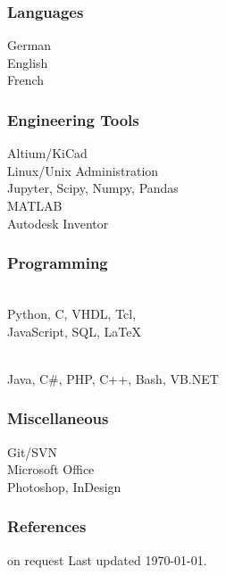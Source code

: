 \begin{facts}
    \subsubsection{Languages}
    German \\
    English \\
    French 
    \sectionsep
    
    \subsubsection{Engineering Tools}
    Altium/KiCad\\
    Linux/Unix Administration\\
    Jupyter, Scipy, Numpy, Pandas\\
    MATLAB\\
    Autodesk Inventor
    \sectionsep
    
    \subsubsection{Programming}
    \\
    Python, C, VHDL, Tcl,\\
    JavaScript, SQL, LaTeX
    \sectionsep
    
    \\
    Java, C\#, PHP, C++, Bash, VB.NET
    \sectionsep
    
    \subsubsection{Miscellaneous}
    Git/SVN\\
    Microsoft Office\\
    Photoshop, InDesign
    \sectionsep
    
    \subsubsection{References}
    on request
    \vfill
    Last updated \today.
    
    \end{facts}%
